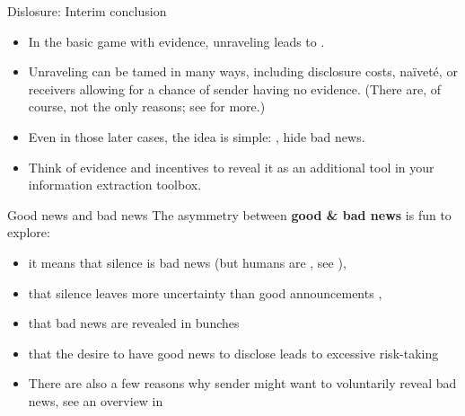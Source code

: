 \documentclass[english,10pt
,aspectratio=169
]{beamer}
\begin{document}
\begin{frame}{Dislosure: Interim conclusion}
\begin{itemize}
	\item In the basic game with evidence, unraveling leads to .
	\item Unraveling can be tamed in many ways, including disclosure costs, na{\"i}vet{\'e}, or receivers allowing for a chance of sender having no evidence. (There are, of course, not the only reasons; see \cite{dranove_quality_2010} for more.)
	\item Even in those later cases, the idea is simple: , \alert{hide bad news}.
	\item Think of evidence and incentives to reveal it as an additional tool in your information extraction toolbox.
\end{itemize}
\end{frame}


\begin{frame}{Good news and bad news}
	The asymmetry between \textbf{good \& bad news} is fun to explore:
	\begin{itemize}[<+->]
		\item it means that \alert{silence is bad news} (but humans are , see \cite*{jin_is_2021}), 
		\item that \alert{silence leaves more uncertainty} than good announcements \citep{shin_disclosures_2003}, 
		\item that bad news are revealed in \alert{bunches} \citep*{acharya_endogenous_2011}
		\item that the desire to have good news to disclose leads to \alert{excessive risk-taking} \citep*{ben-porath_disclosure_2018} %
		
		\bigskip 
		\item There are also a few reasons why sender might want to voluntarily reveal bad news, see an overview in \cite{smirnov_bad_2022}
	\end{itemize}
\end{frame}
\end{document}
